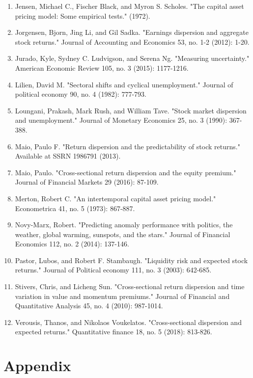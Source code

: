 \documentclass[12pt]{article}
\begin{document}
\begin{enumerate}
    \item {Jensen, Michael C., Fischer Black, and Myron S. Scholes. "The capital asset pricing model: Some empirical tests." (1972).}
    \item{Jorgensen, Bjorn, Jing Li, and Gil Sadka. "Earnings dispersion and aggregate stock returns." Journal of Accounting and Economics 53, no. 1-2 (2012): 1-20.}
    \item{Jurado, Kyle, Sydney C. Ludvigson, and Serena Ng. "Measuring uncertainty." American Economic Review 105, no. 3 (2015): 1177-1216.}
    \item{Lilien, David M. "Sectoral shifts and cyclical unemployment." Journal of political economy 90, no. 4 (1982): 777-793.}
    \item{Loungani, Prakash, Mark Rush, and William Tave. "Stock market dispersion and unemployment." Journal of Monetary Economics 25, no. 3 (1990): 367-388.}
    \item{Maio, Paulo F. "Return dispersion and the predictability of stock returns." Available at SSRN 1986791 (2013).}
    \item{Maio, Paulo. "Cross-sectional return dispersion and the equity premium." Journal of Financial Markets 29 (2016): 87-109.}
    \item{Merton, Robert C. "An intertemporal capital asset pricing model." Econometrica 41, no. 5 (1973): 867-887.}
    \item{Novy-Marx, Robert. "Predicting anomaly performance with politics, the weather, global warming, sunspots, and the stars." Journal of Financial Economics 112, no. 2 (2014): 137-146.}
    \item{Pastor, Lubos, and Robert F. Stambaugh. "Liquidity risk and expected stock returns." Journal of Political economy 111, no. 3 (2003): 642-685.}
    \item{Stivers, Chris, and Licheng Sun. "Cross-sectional return dispersion and time variation in value and momentum premiums." Journal of Financial and Quantitative Analysis 45, no. 4 (2010): 987-1014.}
    \item{Verousis, Thanos, and Nikolaos Voukelatos. "Cross-sectional dispersion and expected returns." Quantitative finance 18, no. 5 (2018): 813-826.}

\end{enumerate}

\newpage


\section*{Appendix}
\end{document}
